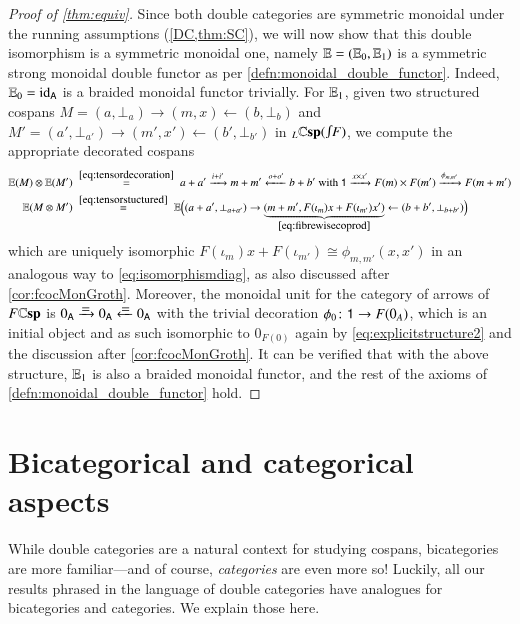 \documentclass[reqno]{amsart}
\begin{document}
\begin{proof}[Proof of \cref{thm:equiv}]
Since both double categories are symmetric monoidal under the running assumptions (\cref{DC,thm:SC}), we will now show that this double isomorphism is a symmetric monoidal one, namely $\mathbf{\mathbb E}=(\mathbf{\mathbb E}_0,\mathbf{\mathbb E}_1)$ is a symmetric strong monoidal double functor as per \cref{defn:monoidal_double_functor}. Indeed, $\mathbf{\mathbb E}_0=\mathrm{id}_{\mathsf{A}}$ is a braided monoidal functor trivially. For $\mathbf{\mathbb E}_1$, given two structured cospans $M=(a,\bot_a)\to(m,x)\leftarrow(b,\bot_b)$ and $M'=(a',\bot_{a'})\to(m',x')\leftarrow(b',\bot_{b'})$ in $_L\lCsp(\inta F)$, we compute the appropriate decorated cospans
\begin{align*}
\lE(M)\ot\lE(M')&\;\stackrel{\cref{eq:tensordecoration}}{=}\;a+a'\xrightarrow{i+i'}m+m'\xleftarrow{o+o'}b+b' \textrm{ with }\one\xrightarrow{x\times x'}F(m)\times F(m')\xrightarrow{\phi_{m,m'}}F(m+m') \\
\lE(M\ot M')&\;\stackrel{\cref{eq:tensorstuctured}}{=}\;\lE\Big((a+a',\bot_{a+a'})\to\underbrace{(m+m',F(\iota_m)x+F(\iota_{m'})x')}_{\cref{eq:fibrewisecoprod}}\leftarrow(b+b',\bot_{b+b'})\Big)%
\end{align*}
which are uniquely isomorphic $F(\iota_m)x+F(\iota_{m'})\cong \phi_{m,m'}(x,x')$ in an analogous way to \cref{eq:isomorphismdiag}, as also discussed after \cref{cor:fcocMonGroth}.
Moreover, the monoidal unit for the category of arrows of $F\mathbf{\mathbb Csp}$ is $0_\A\xrightarrow{\raisebox{-3pt}[0pt][0pt]{$=$}}0_\A\xleftarrow{\raisebox{-3pt}[0pt][0pt]{$=$}}0_\A$ with the trivial decoration $\phi_0\colon \mathsf{1}\to F(0_A)$,
which is an initial object and as such isomorphic to $0_{F(0)}$
again by \cref{eq:explicitstructure2} and the discussion after \cref{cor:fcocMonGroth}.
It can be verified that with the above structure, $\mathbf{\mathbb E}_1$ is also a braided monoidal functor, and the rest of the axioms of \cref{defn:monoidal_double_functor} hold.
\end{proof}

\section{Bicategorical and categorical aspects}
\label{spinoffs}

While double categories are a natural context for studying cospans, bicategories are more 
familiar---and of course, \emph{categories} are even more so!   Luckily, all our results 
phrased in the language of double categories have analogues for bicategories and categories.  
We explain those here.
\end{document}

